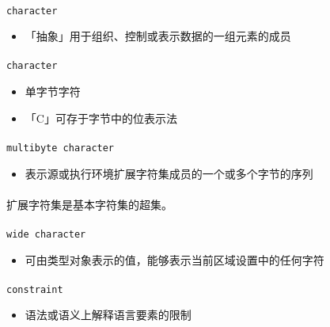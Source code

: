 \paragraph{}
\texttt{character}
\begin{itemize}
  \item[]{「抽象」用于组织、控制或表示数据的一组元素的成员}
\end{itemize}

\paragraph{}
\texttt{character}
\begin{itemize}
  \item[]{单字节字符}
  \item[]{「C」可存于字节中的位表示法}
\end{itemize}

\paragraph{}
\texttt{multibyte character}
\begin{itemize}
  \item[]{表示源或执行环境扩展字符集成员的一个或多个字节的序列}
\end{itemize}

\paragraph{}
\notes* 扩展字符集是基本字符集的超集。

\paragraph{}
\texttt{wide character}
\begin{itemize}
  \item[]{可由类型对象表示的值，能够表示当前区域设置中的任何字符}
\end{itemize}

\paragraph{}
\texttt{constraint}
\begin{itemize}
  \item[]{语法或语义上解释语言要素的限制}
\end{itemize}


